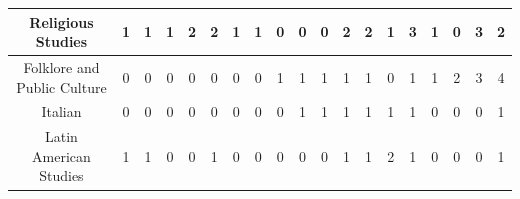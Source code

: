 \documentclass[10]{article}
\begin{document}
\begin{landscape}
\begin{longtable}[c]{|ccccccccccccccccccc|}
	\multicolumn{1}{|c|}{Religious Studies}                          & \multicolumn{1}{c|}{1}          & \multicolumn{1}{c|}{1}          & \multicolumn{1}{c|}{1}          & \multicolumn{1}{c|}{2}          & \multicolumn{1}{c|}{2}          & \multicolumn{1}{c|}{1}          & \multicolumn{1}{c|}{1}          & \multicolumn{1}{c|}{0}          & \multicolumn{1}{c|}{0}          & \multicolumn{1}{c|}{0}          & \multicolumn{1}{c|}{2}          & \multicolumn{1}{c|}{2}          & \multicolumn{1}{c|}{1}          & \multicolumn{1}{c|}{3}          & \multicolumn{1}{c|}{1}          & \multicolumn{1}{c|}{0}          & \multicolumn{1}{c|}{3}          & 2          \\ \hline
	\multicolumn{1}{|c|}{Folklore and Public Culture}                & \multicolumn{1}{c|}{0}          & \multicolumn{1}{c|}{0}          & \multicolumn{1}{c|}{0}          & \multicolumn{1}{c|}{0}          & \multicolumn{1}{c|}{0}          & \multicolumn{1}{c|}{0}          & \multicolumn{1}{c|}{0}          & \multicolumn{1}{c|}{1}          & \multicolumn{1}{c|}{1}          & \multicolumn{1}{c|}{1}          & \multicolumn{1}{c|}{1}          & \multicolumn{1}{c|}{1}          & \multicolumn{1}{c|}{0}          & \multicolumn{1}{c|}{1}          & \multicolumn{1}{c|}{1}          & \multicolumn{1}{c|}{2}          & \multicolumn{1}{c|}{3}          & 4          \\ \hline
	\multicolumn{1}{|c|}{Italian}                                    & \multicolumn{1}{c|}{0}          & \multicolumn{1}{c|}{0}          & \multicolumn{1}{c|}{0}          & \multicolumn{1}{c|}{0}          & \multicolumn{1}{c|}{0}          & \multicolumn{1}{c|}{0}          & \multicolumn{1}{c|}{0}          & \multicolumn{1}{c|}{0}          & \multicolumn{1}{c|}{1}          & \multicolumn{1}{c|}{1}          & \multicolumn{1}{c|}{1}          & \multicolumn{1}{c|}{1}          & \multicolumn{1}{c|}{1}          & \multicolumn{1}{c|}{1}          & \multicolumn{1}{c|}{0}          & \multicolumn{1}{c|}{0}          & \multicolumn{1}{c|}{0}          & 1          \\ \hline
	\multicolumn{1}{|c|}{Latin American Studies}                     & \multicolumn{1}{c|}{1}          & \multicolumn{1}{c|}{1}          & \multicolumn{1}{c|}{0}          & \multicolumn{1}{c|}{0}          & \multicolumn{1}{c|}{1}          & \multicolumn{1}{c|}{0}          & \multicolumn{1}{c|}{0}          & \multicolumn{1}{c|}{0}          & \multicolumn{1}{c|}{0}          & \multicolumn{1}{c|}{0}          & \multicolumn{1}{c|}{1}          & \multicolumn{1}{c|}{1}          & \multicolumn{1}{c|}{2}          & \multicolumn{1}{c|}{1}          & \multicolumn{1}{c|}{0}          & \multicolumn{1}{c|}{0}          & \multicolumn{1}{c|}{0}          & 1          \\ \hline

\end{longtable}
\end{landscape}
\end{document}
